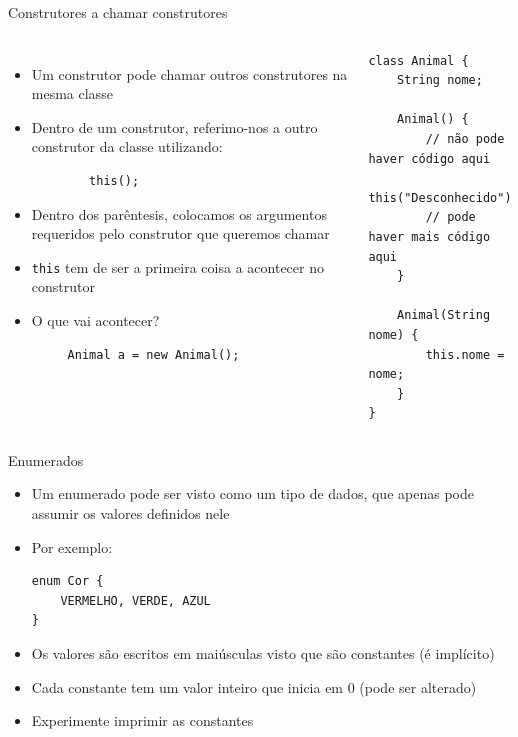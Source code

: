 \documentclass[portuguese, aspectratio=169, xcolor=table]{beamer}
\begin{document}
\begin{frame}[fragile]{Construtores a chamar construtores}
\begin{columns}
\begin{itemize}
    \item Um construtor pode chamar outros construtores na mesma classe
    \item Dentro de um construtor, referimo-nos a outro construtor da classe utilizando:
    \begin{verbatim}
        this();
    \end{verbatim}
    \item Dentro dos parêntesis, colocamos os argumentos requeridos pelo construtor que queremos chamar
    \item \texttt{this} tem de ser a primeira coisa a acontecer no construtor
    \item O que vai acontecer?
    \begin{verbatim}
     Animal a = new Animal();
    \end{verbatim}
\end{itemize}
\begin{verbatim}
class Animal {
    String nome;
    
    Animal() {
        // não pode haver código aqui
        this("Desconhecido");
        // pode haver mais código aqui
    }
    
    Animal(String nome) {
        this.nome = nome;
    }
}
\end{verbatim}
\end{columns}
\end{frame}






\begin{frame}[fragile]{Enumerados}
\begin{itemize}
\item Um enumerado pode ser visto como um tipo de dados, que apenas pode assumir os valores definidos nele
\item Por exemplo:
\begin{verbatim}
enum Cor {
    VERMELHO, VERDE, AZUL
}
\end{verbatim}
\item Os valores são escritos em maiúsculas visto que são constantes (é implícito)
\item Cada constante tem um valor inteiro que inicia em 0 (pode ser alterado)
\item Experimente imprimir as constantes
\end{itemize}

\end{frame}
\end{document}
